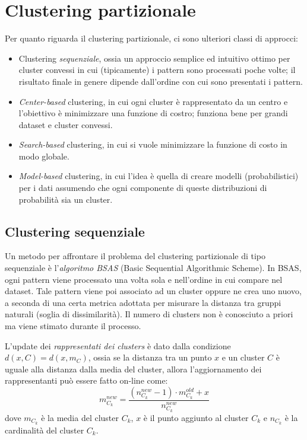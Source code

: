 \documentclass[a4paper,oneside,titlepage]{book}
\begin{document}
\section{Clustering partizionale}
Per quanto riguarda il clustering partizionale, ci sono ulteriori classi di approcci:
\begin{itemize}
    \item Clustering \textit{sequenziale}, ossia un approccio semplice ed intuitivo ottimo per cluster convessi in cui (tipicamente) i pattern sono processati poche volte; il risultato finale in genere dipende dall'ordine con cui sono presentati i pattern.
    \item \textit{Center-based} clustering, in cui ogni cluster è rappresentato da un centro e l'obiettivo è minimizzare una funzione di costro; funziona bene per grandi dataset e cluster convessi.
    \item \textit{Search-based} clustering, in cui si vuole minimizzare la funzione di costo in modo globale.
    \item \textit{Model-based} clustering, in cui l'idea è quella di creare modelli (probabilistici) per i dati assumendo che ogni componente di queste distribuzioni di probabilità sia un cluster.
\end{itemize}

\subsection{Clustering sequenziale}
Un metodo per affrontare il problema del clustering partizionale di tipo sequenziale è l'\textit{algoritmo BSAS} (Basic Sequential Algorithmic Scheme). In BSAS, ogni pattern viene processato una volta sola e nell'ordine in cui compare nel dataset. Tale pattern viene poi
associato ad un cluster oppure ne crea uno nuovo, a seconda di una certa metrica adottata per misurare la distanza tra gruppi naturali (soglia di dissimilarità). Il numero di clusters non è conosciuto a priori ma viene stimato durante il processo.

L'update dei \textit{rappresentati dei clusters} è dato dalla condizione $d(x,C) = d(x,m_C)$, ossia se la distanza tra un punto $x$ e un cluster $C$ è uguale alla distanza dalla media del cluster, allora l'aggiornamento dei rappresentanti può essere fatto on-line come:
\[ m_{C_k}^{new} = \frac{(n_{C_k}^{new} - 1) \cdot m_{C_k}^{old} + x}{n_{C_k}^{new}} \]
dove $m_{C_k}$ è la media del cluster $C_k$, $x$ è il punto aggiunto al cluster $C_k$ e $n_{C_k}$ è la cardinalità del cluster $C_k$.
\end{document}
